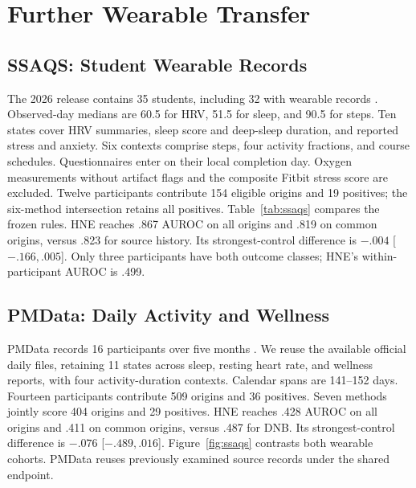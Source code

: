 \section{Further Wearable Transfer}
\label{app:ssaqs}

\subsection{SSAQS: Student Wearable Records}
The 2026 release contains 35 students, including 32 with wearable records \citep{hneD10}. Observed-day medians are 60.5 for HRV, 51.5 for sleep, and 90.5 for steps. Ten states cover HRV summaries, sleep score and deep-sleep duration, and reported stress and anxiety. Six contexts comprise steps, four activity fractions, and course schedules. Questionnaires enter on their local completion day. Oxygen measurements without artifact flags and the composite Fitbit stress score are excluded. Twelve participants contribute 154 eligible origins and 19 positives; the six-method intersection retains all positives. Table~\ref{tab:ssaqs} compares the frozen rules. HNE reaches .867 AUROC on all origins and .819 on common origins, versus .823 for source history. Its strongest-control difference is $-.004$ [$-.166,.005$]. Only three participants have both outcome classes; HNE's within-participant AUROC is .499.

\begin{table}[H]
\centering
\caption{Frozen-source wearable transfer. SSAQS uses 118 origins from 11 people; PMData uses 404 from 14. Within is mean within-participant AUROC.}
\label{tab:ssaqs}
\end{table}

\subsection{PMData: Daily Activity and Wellness}
PMData records 16 participants over five months \citep{pmdata2020}. We reuse the available official daily files, retaining 11 states across sleep, resting heart rate, and wellness reports, with four activity-duration contexts. Calendar spans are 141--152 days. Fourteen participants contribute 509 origins and 36 positives. Seven methods jointly score 404 origins and 29 positives. HNE reaches .428 AUROC on all origins and .411 on common origins, versus .487 for DNB. Its strongest-control difference is $-.076$ [$-.489,.016$]. Figure~\ref{fig:ssaqs} contrasts both wearable cohorts. PMData reuses previously examined source records under the shared endpoint.

